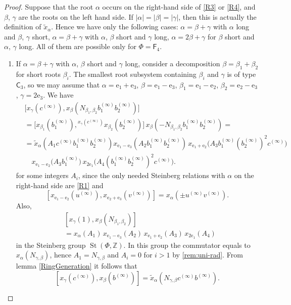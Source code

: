 \documentclass{article}
\numberwithin{equation}{section}
\theoremstyle{definition}
\theoremstyle{remark}
\DeclareMathOperator\St{St}
\newcommand{\up}[2]{{^{#1}\!{#2}}}
\newcommand{\rC}{\mathsf{C}}
\newcommand{\rF}{\mathsf{F}}
\begin{document}
\begin{proof}

Suppose that the root \(\alpha\) occurs on the right-hand side of \eqref{R3} or \eqref{R4}, and \(\beta\), \(\gamma\) are the roots on the left hand side. If \(|\alpha| = |\beta| = |\gamma|\), then this is actually the definition of \(\widetilde x_\alpha\). Hence we have only the following cases: \(\alpha = \beta + \gamma\) with \(\alpha\) long and \(\beta\), \(\gamma\) short, \(\alpha = \beta + \gamma\) with \(\alpha\), \(\beta\) short and \(\gamma\) long, \(\alpha = 2\beta + \gamma\) for \(\beta\) short and \(\alpha\), \(\gamma\) long. All of them are possible only for \(\Phi = \rF_4\).

\begin{enumerate}
 \item If \(\alpha = \beta + \gamma\) with \(\alpha\), \(\beta\) short and \(\gamma\) long, consider a decomposition \(\beta = \beta_1 + \beta_2\) for short roots \(\beta_i\). The smallest root subsystem containing \(\beta_i\) and \(\gamma\) is of type \(\rC_3\), so we may assume that \(\alpha = \mathrm e_1 + \mathrm e_3\), \(\beta = \mathrm e_1 - \mathrm e_3\), \(\beta_1 = \mathrm e_1 - \mathrm e_2\), \(\beta_2 = \mathrm e_2 - \mathrm e_3\), \(\gamma = 2\mathrm e_3\). We have
 \begin{align*}
  &\bigl[x_\gamma(c^{(\infty)}),
  x_\beta(N_{\beta_1, \beta_2} b_1^{(\infty)} b_2^{(\infty)})\bigr]\\
  &= \bigl[x_{\beta_1}(b_1^{(\infty)}),
  \up{x_\gamma(c^{(\infty)})}
   {x_{\beta_2}(b_2^{(\infty)})}\bigr]\,
  x_\beta(-N_{\beta_1, \beta_2} b_1^{(\infty)} b_2^{(\infty)}) =\\
  &= \widetilde x_\alpha(A_1 c^{(\infty)} b_1^{(\infty)} b_2^{(\infty)})
  x_{\mathrm e_1 - \mathrm e_3}(A_2 b_1^{(\infty)} b_2^{(\infty)})\,
  x_{\mathrm e_1 + \mathrm e_2}\bigl(A_3 b_1^{(\infty)} (b_2^{(\infty)})^2 c^{(\infty)}\bigr)\\
  &\quad x_{\mathrm e_1 - \mathrm e_2}\bigl(A_3 b_1^{(\infty)}\bigr)\,
  x_{2\mathrm e_1}\bigl(A_4 (b_1^{(\infty)} b_2^{(\infty)})^2 c^{(\infty)} \bigr).
 \end{align*}
 for some integers \(A_i\), since the only needed Steinberg relations with \(\alpha\) on the right-hand side are \eqref{R1} and
 \[[x_{\mathrm e_1 - \mathrm e_2}(u^{(\infty)}), x_{\mathrm e_2 + \mathrm e_3}(v^{(\infty)})] = x_\alpha(\pm u^{(\infty)} v^{(\infty)}).\]
 Also,
 \begin{align*}
  &[x_\gamma(1), x_\beta(N_{\beta_1, \beta_2})]\\
  &= x_\alpha(A_1)\, x_{\mathrm e_1 - \mathrm e_3}(A_2)\, x_{\mathrm e_1 + \mathrm e_2}(A_3)\, x_{2 \mathrm e_1}(A_4)
 \end{align*}
 in the Steinberg group \(\St(\Phi, \mathbb Z)\). In this group the commutator equals to \(x_\alpha(N_{\gamma, \beta})\), hence \(A_1 = N_{\gamma, \beta}\) and \(A_i = 0\) for \(i > 1\) by \cref{rem:uni-rad}. From lemma \ref{RingGeneration} it follows that
 \[[x_\gamma(c^{(\infty)}), x_\beta(b^{(\infty)})] = 
 \widetilde x_\alpha(N_{\gamma, \beta} c^{(\infty)} b^{(\infty)}).\]


\end{enumerate}
\end{proof}
\end{document}
